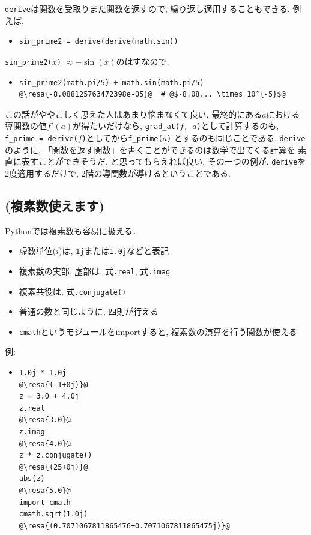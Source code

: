 \documentclass[10pt,dvipdfmx]{article}
\newcommand{\resa}[1]{ {\textsl{$\rightarrow$ #1}}}
\begin{document}
{\tt derive}は関数を受取りまた関数を返すので,
繰り返し適用することもできる. 例えば,
\begin{itemize}
\item []
\begin{lstlisting}
sin_prime2 = derive(derive(math.sin))
\end{lstlisting}
\end{itemize}
{\tt sin\_prime2($x$)} $\approx -\sin(x)$のはずなので,
\begin{itemize}
\item []
\begin{lstlisting}
sin_prime2(math.pi/5) + math.sin(math.pi/5)
@\resa{-8.088125763472398e-05}@  # @$-8.08... \times 10^{-5}$@
\end{lstlisting}
\end{itemize}

この話がややこしく思えた人はあまり悩まなくて良い.
最終的にある$a$における導関数の値$f'(a)$が得たいだけなら,
{\tt grad\_at($f$, $a$)}として計算するのも,
{\tt f\_prime = derive($f$)}としてから{\tt f\_prime($a$)}
とするのも同じことである. {\tt derive}のように,
「関数を返す関数」を書くことができるのは数学で出てくる計算を
素直に表すことができそうだ, と思ってもらえれば良い.
その一つの例が, {\tt derive}を2度適用するだけで,
2階の導関数が導けるということである.

\subsection{{\scriptsize (複素数使えます)}}
Pythonでは複素数も容易に扱える．
\begin{itemize}
\item 虚数単位($i$)は, {\tt 1j}または{\tt 1.0j}などと表記
\item 複素数の実部, 虚部は, 式{\tt .real}, 式{\tt .imag}
\item 複素共役は, 式{\tt .conjugate()}
\item 普通の数と同じように, 四則が行える
\item {\tt cmath}というモジュールをimportすると, 
複素数の演算を行う関数が使える
\end{itemize}

例:
\begin{itemize}
\item []
\begin{lstlisting}
1.0j * 1.0j
@\resa{(-1+0j)}@
z = 3.0 + 4.0j
z.real
@\resa{3.0}@
z.imag
@\resa{4.0}@
z * z.conjugate()
@\resa{(25+0j)}@
abs(z)
@\resa{5.0}@
import cmath
cmath.sqrt(1.0j)
@\resa{(0.7071067811865476+0.7071067811865475j)}@
\end{lstlisting}
\end{itemize}
\end{document}
